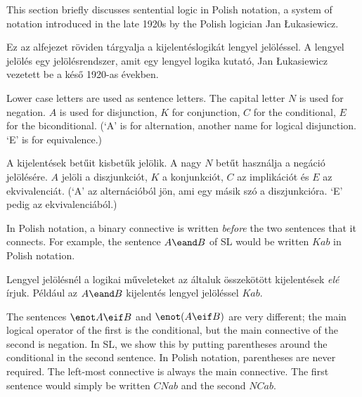 This section briefly discusses sentential logic in Polish notation, a system of notation introduced in the late 1920s by the Polish logician Jan {\L}ukasiewicz.

Ez az alfejezet röviden tárgyalja a kijelentéslogikát lengyel jelöléssel. A lengyel jelölés egy jelölésrendszer, amit egy lengyel logika kutató, Jan {\L}ukasiewicz vezetett be a késő 1920-as években.


Lower case letters are used as sentence letters. The capital letter $N$ is used for negation. $A$ is used for disjunction, $K$ for conjunction, $C$ for the conditional, $E$ for the biconditional. (`A' is for alternation, another name for logical disjunction. `E' is for equivalence.)

A kijelentések betűit kisbetűk jelölik. A nagy $N$ betűt használja a negáció jelölésére. $A$ jelöli a diszjunkciót, $K$ a konjunkciót, $C$ az implikációt és $E$ az ekvivalenciát. (`A' az  alternációból jön, ami egy másik szó a diszjunkcióra. `E' pedig az ekvivalenciából.)


In Polish notation, a binary connective is written \emph{before} the two sentences that it connects. For example, the sentence $A\eand B$ of SL would be written $Kab$ in Polish notation.

Lengyel jelölésnél a logikai műveleteket az általuk összekötött kijelentések \emph{elé} írjuk. Például az $A\eand B$ kijelentés lengyel jelöléssel $Kab$.


The sentences $\enot A\eif B$ and $\enot (A\eif B)$ are very different; the main logical operator of the first is the conditional, but the main connective of the second is negation. In SL, we show this by putting parentheses around the conditional in the second sentence. In Polish notation, parentheses are never required. The left-most connective is always the main connective. The first sentence would simply be written $CNab$ and the second $NCab$.

